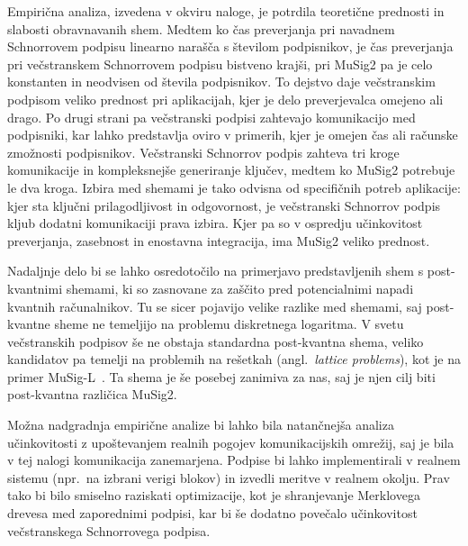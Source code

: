 Empirična analiza, izvedena v okviru naloge, je potrdila teoretične prednosti in slabosti obravnavanih
shem. Medtem ko čas preverjanja pri navadnem Schnorrovem podpisu linearno narašča s številom
podpisnikov, je čas preverjanja pri večstranskem Schnorrovem podpisu bistveno krajši, pri MuSig2 pa
je celo konstanten in neodvisen od števila podpisnikov. To dejstvo daje večstranskim podpisom veliko
prednost pri aplikacijah, kjer je delo preverjevalca omejeno ali drago. Po drugi strani pa večstranski
podpisi zahtevajo komunikacijo med podpisniki, kar lahko predstavlja oviro v primerih, kjer je omejen čas
ali računske zmožnosti podpisnikov.
Večstranski Schnorrov podpis zahteva tri kroge komunikacije in kompleksnejše generiranje ključev,
medtem ko MuSig2 potrebuje le dva kroga. Izbira med shemami je tako odvisna od specifičnih potreb
aplikacije: kjer sta ključni prilagodljivost in odgovornost, je večstranski Schnorrov podpis kljub
dodatni komunikaciji prava izbira. Kjer pa so v ospredju učinkovitost preverjanja, zasebnost in
enostavna integracija, ima MuSig2 veliko prednost.
%

Nadaljnje delo bi se lahko osredotočilo na primerjavo predstavljenih shem s post-kvantnimi shemami,
ki so zasnovane za zaščito pred potencialnimi napadi kvantnih računalnikov. Tu se sicer pojavijo
velike razlike med shemami, saj post-kvantne sheme ne temeljijo na problemu diskretnega logaritma.
V svetu večstranskih podpisov še ne obstaja standardna post-kvantna shema, veliko kandidatov pa temelji
na problemih na rešetkah (angl.\ \textit{lattice problems}), kot je na primer MuSig-L~\cite{boschini2022musigl}.
Ta shema je še posebej zanimiva za nas, saj je njen cilj biti post-kvantna različica MuSig2.

Možna nadgradnja empirične analize bi lahko bila natančnejša analiza učinkovitosti z upoštevanjem realnih
pogojev komunikacijskih omrežij, saj je bila v tej nalogi komunikacija zanemarjena. Podpise bi lahko
implementirali v realnem sistemu (npr.\ na izbrani verigi blokov) in izvedli meritve v realnem okolju.
Prav tako bi bilo smiselno raziskati optimizacije, kot je shranjevanje Merklovega drevesa med
zaporednimi podpisi, kar bi še dodatno povečalo učinkovitost večstranskega Schnorrovega podpisa.
